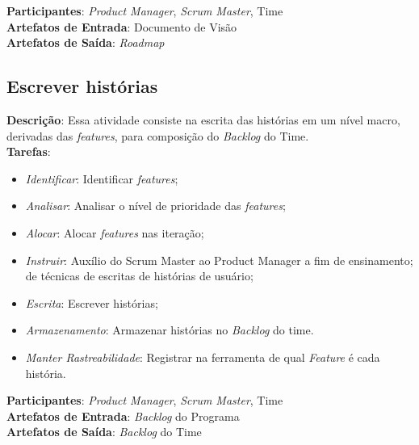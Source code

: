   \textbf{Participantes}: \textit{Product Manager}, \textit{Scrum Master}, Time \\

  \textbf{Artefatos de Entrada}: Documento de Visão \\

  \textbf{Artefatos de Saída}:  \textit{Roadmap}\\

  \subsection{Escrever histórias}
  \textbf{Descrição}: Essa atividade consiste na escrita das histórias em um nível macro, derivadas das \textit{features}, para composição do \textit{Backlog} do Time. \\

  \textbf{Tarefas}:
  \begin{itemize}
   \item \indent \textit{Identificar}: Identificar \textit{features};

   \item \indent \textit{Analisar}: Analisar o nível de prioridade das \textit{features};

   \item \indent \textit{Alocar}: Alocar \textit{features} nas iteração;

   \item \indent \textit{Instruir}: Auxílio do Scrum Master ao Product Manager a fim de ensinamento; de técnicas de escritas de histórias de usuário;

   \item \indent \textit{Escrita}: Escrever histórias;

   \item \indent \textit{Armazenamento}: Armazenar histórias no \textit{Backlog} do time.
   
   \item \indent \textit{Manter Rastreabilidade}: Registrar na ferramenta de qual \textit{Feature} é cada história.

  \end{itemize}

  \textbf{Participantes}: \textit{Product Manager}, \textit{Scrum Master}, Time\\

  \textbf{Artefatos de Entrada}: \textit{Backlog} do Programa \\

  \textbf{Artefatos de Saída}:   \textit{Backlog} do Time \\

